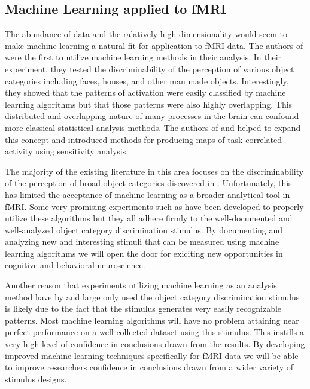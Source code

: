 \documentclass[12pt]{article}
\begin{document}
\subsection{Machine Learning applied to fMRI}
The abundance of data and the ralatively high dimensionality would seem to make machine learning a natural fit for application to fMRI data.
The authors of \cite{Haxby2001} were the first to utilize machine learning methods in their analysis.
In their experiment, they tested the discriminability of the perception of various object categories including faces, houses, and other man made objects.
Interestingly, they showed that the patterns of activation were easily classified by machine learning algorithms but that those patterns were also highly overlapping.
This distributed and overlapping nature of many processes in the brain can confound more classical statistical analysis methods.
The authors of \cite{Mitchell2003} and \cite{Haynes2006} helped to expand this concept and introduced methods for producing maps of task correlated activity using sensitivity analysis.

The majority of the existing literature in this area focuses on the discriminability of the perception of broad object categories discovered in \cite{Haxby2001}.
Unfortunately, this has limited the acceptance of machine learning as a broader analytical tool in fMRI.
Some very promising experiments such as \cite{Lewis-Peacock2012} have been developed to properly utilize these algorithms but they all adhere firmly to the well-documented and well-analyzed object category discrimination stimulus.
By documenting and analyzing new and interesting stimuli that can be measured using machine learning algorithms we will open the door for exiciting new opportunities in cognitive and behavioral neuroscience.

Another reason that experiments utilizing machine learning as an analysis method have by and large only used the object category discrimination stimulus is likely due to the fact that the stimulus generates very easily recognizable patterns.
Most machine learning algorithms will have no problem attaining near perfect performance on a well collected dataset using this stimulus.
This instills a very high level of confidence in conclusions drawn from the results.
By developing improved machine learning techniques specifically for fMRI data we will be able to improve researchers confidence in conclusions drawn from a wider variety of stimulus designs.
\end{document}
